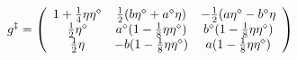 \begin{equation}
g^\ddag=\left(\begin{array}{ccc}
1+{1\over 4}\eta\eta^\diamond&{1\over 
2}(b\eta^\diamond+a^\diamond\eta)
&-{1\over 2}(a\eta^\diamond-b^\diamond\eta\\
{1\over 2}\eta^\diamond&a^\diamond(1-{1\over
  8}\eta\eta^\diamond)&
b^\diamond(1-{1\over 8}\eta\eta^\diamond)\\
{1\over 2}\eta&-b(1-{1\over
  8}\eta\eta^\diamond)& 
a(1-{1\over 8}\eta\eta^\diamond)
\end{array}\right)
\end{equation}

